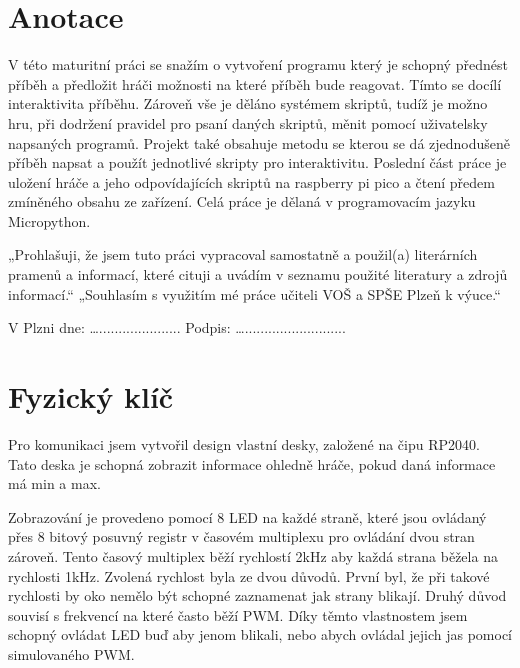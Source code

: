 \documentclass[12pt,a4paper]{article}
\begin{document}



\newpage

\section*{Anotace}
V této maturitní práci se snažím o vytvoření programu který je schopný přednést příběh a předložit hráči možnosti na které příběh bude reagovat. Tímto se docílí interaktivita příběhu. Zároveň vše je děláno systémem skriptů, tudíž je možno hru, při dodržení pravidel pro psaní daných skriptů, měnit pomocí uživatelsky napsaných programů. Projekt také obsahuje metodu se kterou se dá zjednodušeně příběh napsat a použít jednotlivé skripty pro interaktivitu. Poslední část práce je uložení hráče a jeho odpovídajících skriptů na raspberry pi pico a čtení předem zmíněného obsahu ze zařízení. Celá práce je dělaná v programovacím jazyku Micropython.


\vspace*{\fill}

„Prohlašuji, že jsem tuto práci vypracoval samostatně a použil(a) literárních pramenů a informací, které cituji a uvádím v seznamu použité literatury a zdrojů informací.“ 
„Souhlasím s využitím mé práce učiteli VOŠ a SPŠE Plzeň k výuce.“ 
\begin{flushright}
	V Plzni dne: …..................... Podpis: …..........................
\end{flushright} 

\newpage
\section{Fyzický klíč}
Pro komunikaci jsem vytvořil design vlastní desky, založené na čipu RP2040. Tato deska je schopná zobrazit informace ohledně hráče, pokud daná informace má min a max. 

Zobrazování je provedeno pomocí 8 LED na každé straně, které jsou ovládaný přes 8 bitový posuvný registr v časovém multiplexu pro ovládání dvou stran zároveň. Tento časový multiplex běží rychlostí 2kHz aby každá strana běžela na rychlosti 1kHz. Zvolená rychlost byla ze dvou důvodů. První byl, že při takové rychlosti by oko nemělo být schopné zaznamenat jak strany blikají. Druhý důvod souvisí s frekvencí na které často běží PWM. Díky těmto vlastnostem jsem schopný ovládat LED buď aby jenom blikali, nebo abych ovládal jejich jas pomocí simulovaného PWM.  
\end{document}
